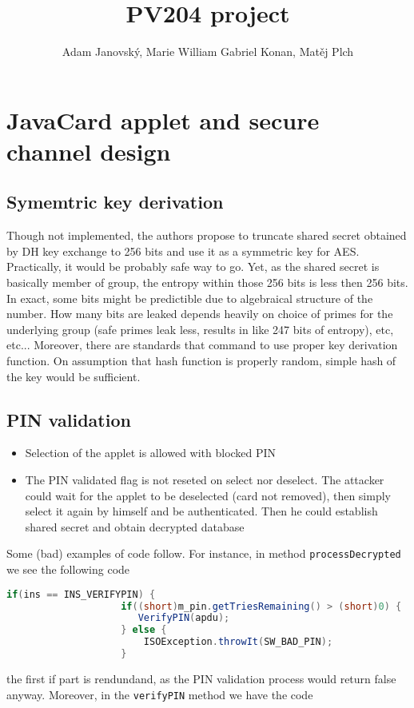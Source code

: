 \documentclass[11pt,a4paper]{article}
\title{PV204 project}
\author{Adam Janovský, Marie William Gabriel Konan, Matěj Plch}
\date{}
\begin{document}
\maketitle
\section*{JavaCard applet and secure channel design}

\subsection*{Symemtric key derivation}

Though not implemented, the authors propose to truncate shared secret obtained by DH key exchange to 256 bits and use it as a symmetric key for AES. Practically, it would be probably safe way to go. Yet, 
as the shared secret is basically member of group, the entropy within those 256 bits is less then 256 bits. In exact, some bits might be predictible due to algebraical structure of the number. How many bits are leaked depends heavily on choice of primes for the underlying group (safe primes leak less, results in like 247 bits of entropy), etc, etc... Moreover, there are standards that command to use proper key derivation function. On assumption that hash function is properly random, simple hash of the key would be sufficient.

\subsection*{PIN validation}

\begin{itemize}
	\item Selection of the applet is allowed with blocked PIN
	\item The PIN validated flag is not reseted on select nor deselect. The attacker could wait for the applet to be deselected (card not removed), then simply select it again by himself and be authenticated. Then he could establish shared secret and obtain decrypted database
\end{itemize}

Some (bad) examples of code follow. For instance, in method \texttt{processDecrypted} we see the following code

\begin{lstlisting}[language=java]
if(ins == INS_VERIFYPIN) {
                    if((short)m_pin.getTriesRemaining() > (short)0) {
                       VerifyPIN(apdu); 
                    } else {
                        ISOException.throwIt(SW_BAD_PIN);
                    }
\end{lstlisting}
the first if part is rendundand, as the PIN validation process would return false anyway. Moreover, in the \texttt{verifyPIN} method we have the code
\end{document}
